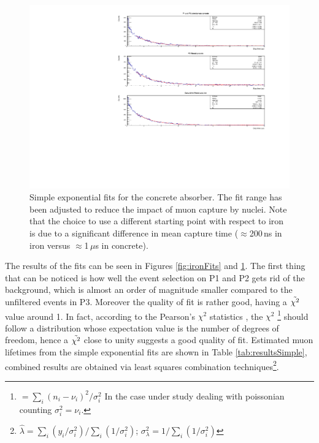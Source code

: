 \documentclass[../main.tex]{subfiles}
\begin{document}
\begin{figure}[htb!]
    \centering
    \includegraphics[width=0.9\linewidth]{images/concrete_filtered_fit.pdf}
    \caption{Simple exponential fits for the concrete absorber. The fit range has been adjusted to reduce the impact of muon capture by nuclei. Note that the choice to use a different starting point with respect to iron is due to a significant difference in mean capture time ($\approx$200\,ns in iron versus $\approx$1\,$\mu$s in concrete).}
    \label{fig:concreteFits}
\end{figure}

The results of the fits can be seen in Figures \ref{fig:ironFits} and \ref{fig:concreteFits}. The first thing that can be noticed is how well the event selection on P1 and P2 gets rid of the background, which is almost an order of magnitude smaller compared to the unfiltered events in P3. Moreover the quality of fit is rather good, having a $\Tilde{\chi^2}$ value around 1. In fact, according to the Pearson's $\chi^2$ statistics \cite{pearson1900x}, the $\chi^2$ \footnote{$=\sum_i (n_i - \nu_i)^2/\sigma_i^2$ In the case under study dealing with poissonian counting $\sigma_i^2=\nu_i.$} should follow a distribution whose expectation value is the number of degrees of freedom, hence a $\Tilde{\chi^2}$ close to unity suggests a good quality of fit. Estimated muon lifetimes from the  simple exponential fits are shown in Table \ref{tab:resultsSimple}, combined results are obtained via least squares combination techniques\footnote{$\hat{\lambda}=\sum_i(y_i/\sigma_i^2)/\sum_i(1/\sigma_i^2)$;\hspace{0.1cm} $\sigma^2_{\lambda}=1/\sum_i(1/\sigma_i^2)$}.
\end{document}

